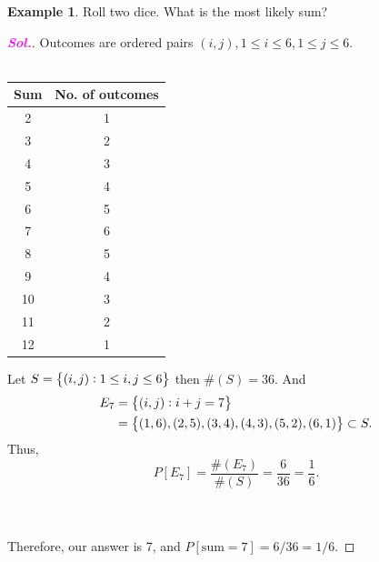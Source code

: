 \documentclass[12pt,a4paper]{article}
\theoremstyle{definition}
\newtheorem{example}{Example}[section]
\theoremstyle{definition}
\theoremstyle{definition}
\theoremstyle{definition}
\theoremstyle{remark}
\theoremstyle{definition}
\newcommand{\sol}{\textcolor{magenta}{\bf \textit{Sol.}}\quad}
\begin{document}
\begin{example}
	Roll two dice. What is the most likely sum?
	\begin{proof}[\sol]
		Outcomes are ordered pairs $(i,j), 1\leq i\leq6, 1\leq j\leq 6$.\\
		\\
		\begin{minipage}{0.49\textwidth}
			\centering
			\begin{tabular}{c|c}
				Sum & No. of outcomes\\
				\hline
				2&1\\3&2\\4&3\\5&4\\6&5\\ \cellcolor{-red}7&\cellcolor{-red}6\\
				8&5\\9&4\\10&3\\11&2\\12&1
			\end{tabular}
		\end{minipage}
	\begin{minipage}{0.49\textwidth}
		Let $S=\set{(i,j):1\leq i,j\leq 6}$ then $\#(S)=36$. And \begin{align*}
		E_7&=\set{(i,j):i+j=7}\\
		&=\set{(1,6),(2,5),(3,4),(4,3),(5,2),(6,1)}\subset S.
		\end{align*} Thus, \[
		P[E_7]=\frac{\#(E_7)}{\#(S)}=\frac{6}{36}=\frac{1}{6}.
		\]
	\end{minipage}\\
	\\
	Therefore, our answer is 7, and $P[\text{sum}=7]=6/36=1/6$.
	\end{proof}
\end{example}

\newpage
\end{document}
